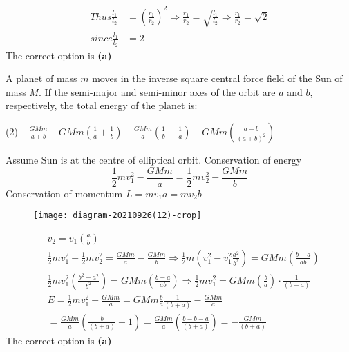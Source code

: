 \begin{enumerate}
\begin{answer}
\begin{align*}
	Thus \frac{l_{1}}{l_{2}}&=\left(\frac{r_{1}}{r_{2}}\right)^{2} \Rightarrow \frac{r_{1}}{r_{2}}=\sqrt{\frac{l_{1}}{l_{2}}} \Rightarrow \frac{r_{1}}{r_{2}}=\sqrt{2}\\ 
	since \frac{l_{1}}{l_{2}}&=2
	\end{align*}
	The correct option is \textbf{(a)}
\end{answer}
\begin{minipage}{\textwidth}
	\item A planet of mass $m$ moves in the inverse square central force field of the Sun of mass $M$. If the semi-major and semi-minor axes of the orbit are $a$ and $b$, respectively, the total energy of the planet is:
\end{minipage}
\begin{tasks}(2)
	\task[\textbf{A.}] $-\frac{G M m}{a+b}$
	\task[\textbf{B.}]$-G M m\left(\frac{1}{a}+\frac{1}{b}\right)$
	\task[\textbf{C.}]$-\frac{G M m}{a}\left(\frac{1}{b}-\frac{1}{a}\right)$
	\task[\textbf{D.}]$-G M m\left(\frac{a-b}{(a+b)^{2}}\right)$
\end{tasks}
\begin{answer}
 Assume Sun is at the centre of elliptical orbit. Conservation of energy\\
  $$\frac{1}{2} m v_{1}^{2}-\frac{G M m}{a}=\frac{1}{2} m v_{2}^{2}-\frac{G M m}{b}$$ Conservation of momentum $L=m v_{1} a=m v_{2} b$\\
  \begin{figure}[H]
  	\centering
  	\texttt{[image: diagram-20210926(12)-crop]}
  \end{figure}
 \begin{align*}
 	&v_{2}=v_{1}\left(\frac{a}{b}\right) \\
 	&\frac{1}{2} m v_{1}^{2}-\frac{1}{2} m v_{2}^{2}=\frac{G M m}{a}-\frac{G M m}{b} \Rightarrow \frac{1}{2} m\left(v_{1}^{2}-v_{1}^{2} \frac{a^{2}}{b^{2}}\right)=G M m\left(\frac{b-a}{a b}\right) \\
 	&\frac{1}{2} m v_{1}^{2}\left(\frac{b^{2}-a^{2}}{b^{2}}\right)=G M m\left(\frac{b-a}{a b}\right) \Rightarrow \frac{1}{2} m v_{1}^{2}=G M m\left(\frac{b}{a}\right) \cdot \frac{1}{(b+a)} \\
 	&E=\frac{1}{2} m v_{1}^{2}-\frac{G M m}{a}=G M m \frac{b}{a} \frac{1}{(b+a)}-\frac{G M m}{a} \\
 	&=\frac{G M m}{a}\left(\frac{b}{(b+a)}-1\right)=\frac{G M m}{a}\left(\frac{b-b-a}{(b+a)}\right)=-\frac{G M m}{(b+a)}
 \end{align*}
 The correct option is \textbf{(a)}	

\end{answer}
\end{enumerate}
